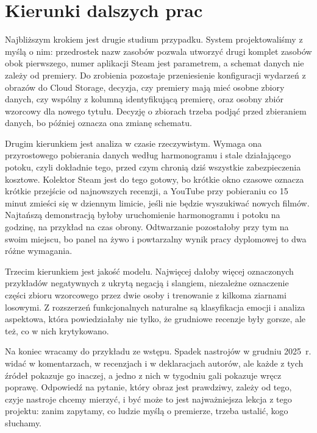 \section{Kierunki dalszych prac}
\label{sec:summary-future}

Najbliższym krokiem jest drugie studium przypadku.
System projektowaliśmy z myślą o nim: przedrostek nazw zasobów pozwala utworzyć drugi komplet zasobów obok pierwszego, numer aplikacji Steam jest parametrem, a schemat danych nie zależy od premiery.
Do zrobienia pozostaje przeniesienie konfiguracji wydarzeń z obrazów do Cloud Storage, decyzja, czy premiery mają mieć osobne zbiory danych, czy wspólny z kolumną identyfikującą premierę, oraz osobny zbiór wzorcowy dla nowego tytułu.
Decyzję o zbiorach trzeba podjąć przed zbieraniem danych, bo później oznacza ona zmianę schematu.

Drugim kierunkiem jest analiza w czasie rzeczywistym.
Wymaga ona przyrostowego pobierania danych według harmonogramu i stale działającego potoku, czyli dokładnie tego, przed czym chronią dziś wszystkie zabezpieczenia kosztowe.
Kolektor Steam jest do tego gotowy, bo krótkie okno czasowe oznacza krótkie przejście od najnowszych recenzji, a YouTube przy pobieraniu co 15 minut zmieści się w dziennym limicie, jeśli nie będzie wyszukiwać nowych filmów.
Najtańszą demonstracją byłoby uruchomienie harmonogramu i potoku na godzinę, na przykład na czas obrony.
Odtwarzanie pozostałoby przy tym na swoim miejscu, bo panel na żywo i powtarzalny wynik pracy dyplomowej to dwa różne wymagania.

Trzecim kierunkiem jest jakość modelu.
Najwięcej dałoby więcej oznaczonych przykładów negatywnych z ukrytą negacją i slangiem, niezależne oznaczenie części zbioru wzorcowego przez dwie osoby i trenowanie z kilkoma ziarnami losowymi.
Z rozszerzeń funkcjonalnych naturalne są klasyfikacja emocji i analiza aspektowa, która powiedziałaby nie tylko, że grudniowe recenzje były gorsze, ale też, co w nich krytykowano.

Na koniec wracamy do przykładu ze wstępu.
Spadek nastrojów w grudniu 2025~r. widać w komentarzach, w recenzjach i w deklaracjach autorów, ale każde z tych źródeł pokazuje go inaczej, a jedno z nich w tygodniu gali pokazuje wręcz poprawę.
Odpowiedź na pytanie, który obraz jest prawdziwy, zależy od tego, czyje nastroje chcemy mierzyć, i być może to jest najważniejsza lekcja z tego projektu: zanim zapytamy, co ludzie myślą o premierze, trzeba ustalić, kogo słuchamy.
